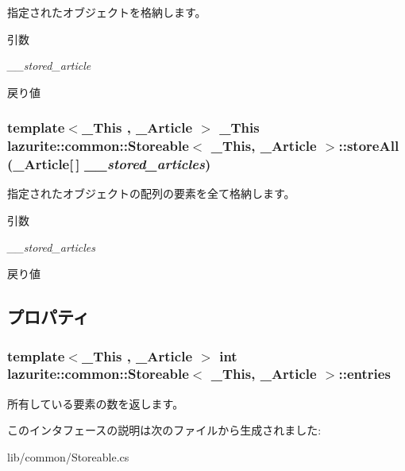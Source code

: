 指定されたオブジェクトを格納します。 
\begin{DoxyParams}{引数}
\item[{\em \_\-\_\-stored\_\-article}]\end{DoxyParams}
\begin{DoxyReturn}{戻り値}

\end{DoxyReturn}
\hypertarget{interfacelazurite_1_1common_1_1_storeable_3_01___this_00_01___article_01_4_a9ea7c4555c82aab2180a21e2e2b745a6}{
\subsubsection[{storeAll}]{\setlength{\rightskip}{0pt plus 5cm}template$<$\_\-This , \_\-Article $>$ \_\-This lazurite::common::Storeable$<$ \_\-This, \_\-Article $>$::storeAll (\_\-Article\mbox{[}$\,$\mbox{]} {\em \_\-\_\-stored\_\-articles})}}
\label{interfacelazurite_1_1common_1_1_storeable_3_01___this_00_01___article_01_4_a9ea7c4555c82aab2180a21e2e2b745a6}


指定されたオブジェクトの配列の要素を全て格納します。 
\begin{DoxyParams}{引数}
\item[{\em \_\-\_\-stored\_\-articles}]\end{DoxyParams}
\begin{DoxyReturn}{戻り値}

\end{DoxyReturn}


\subsection{プロパティ}
\hypertarget{interfacelazurite_1_1common_1_1_storeable_3_01___this_00_01___article_01_4_a9a09381c72b495870c6920d820f8d816}{
\subsubsection[{entries}]{\setlength{\rightskip}{0pt plus 5cm}template$<$\_\-This , \_\-Article $>$ int lazurite::common::Storeable$<$ \_\-This, \_\-Article $>$::entries}}
\label{interfacelazurite_1_1common_1_1_storeable_3_01___this_00_01___article_01_4_a9a09381c72b495870c6920d820f8d816}


所有している要素の数を返します。 

このインタフェースの説明は次のファイルから生成されました:\begin{DoxyCompactItemize}
\item 
lib/common/Storeable.cs\end{DoxyCompactItemize}
